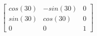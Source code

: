 \documentclass[preview]{standalone}
\begin{document}
\begin{align*}
\left[ \begin{array}{ccc}cos(30) & -sin(30) & 0 \\ sin(30) & cos(30) & 0 \\ 0 & 0 & 1\end{array} \right]
\end{align*}
\end{document}
